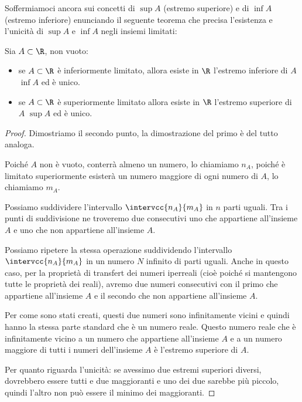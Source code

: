 Soffermiamoci ancora sui concetti di \(\sup{A}\) (estremo superiore) e 
di \(\inf{A}\) (estremo inferiore) enunciando il seguente teorema che 
precisa l'esistenza e l'unicità di \(\sup{A}\) e \(\inf{A}\) negli insiemi 
limitati:
\begin{newtheo}
Sia \(A\subset\R\), non vuoto:
\begin{itemize} [nosep]
\item se \(A \subset \R\) è inferiormente limitato, allora esiste in \(\R\) 
l'estremo inferiore di \(A\) \(\inf{A}\) ed è unico.
\item se \(A \subset \R\) è superiormente limitato allora esiste in \(\R\) 
l'estremo superiore di \(A\) \(\sup{A}\) ed è unico.
\end{itemize}
\end{newtheo}
\begin{proof}
Dimostriamo il secondo punto, la dimostrazione del primo è del tutto 
analoga.

Poiché \(A\) non è vuoto, conterrà almeno un numero, lo chiamiamo \(n_A\), 
poiché è limitato superiormente esisterà un numero maggiore di ogni numero 
di \(A\), lo chiamiamo \(m_A\).

Possiamo suddividere l'intervallo \(\intervcc{n_A}{m_A}\) in \(n\) parti 
uguali.
Tra i punti di suddivisione ne troveremo due consecutivi uno che appartiene 
all'insieme \(A\) e uno che non appartiene all'insieme \(A\).

Possiamo  ripetere la stessa operazione suddividendo l'intervallo 
\(\intervcc{n_A}{m_A}\) in un numero \(N\) infinito di parti uguali.
Anche in questo caso, per la proprietà di transfert dei numeri iperreali 
(cioè poiché si mantengono tutte le proprietà dei reali), avremo due numeri 
consecutivi con il primo che appartiene all'insieme \(A\) e il secondo che 
non appartiene all'insieme \(A\).

Per come sono stati creati, questi due numeri sono infinitamente vicini e 
quindi hanno la stessa parte standard che è un numero reale.
Questo numero reale che è infinitamente vicino a un numero che appartiene 
all'insieme \(A\) e a un numero maggiore di tutti i numeri dell'insieme 
\(A\) è l'estremo superiore di \(A\).

Per quanto riguarda l'unicità: se avessimo due estremi superiori diversi, 
dovrebbero essere tutti e due maggioranti e uno dei due sarebbe più piccolo, 
quindi l'altro non può essere il minimo dei maggioranti.
\end{proof}


